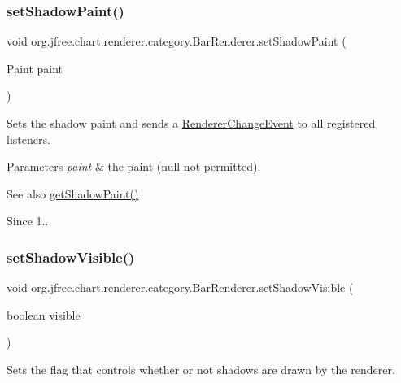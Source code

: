 \subsubsection{\texorpdfstring{set\+Shadow\+Paint()}{setShadowPaint()}}
{\footnotesize\ttfamily void org.\+jfree.\+chart.\+renderer.\+category.\+Bar\+Renderer.\+set\+Shadow\+Paint (\begin{DoxyParamCaption}\item[{Paint}]{paint }\end{DoxyParamCaption})}

Sets the shadow paint and sends a \mbox{\hyperlink{}{Renderer\+Change\+Event}} to all registered listeners.


\begin{DoxyParams}{Parameters}
{\em paint} & the paint ({\ttfamily null} not permitted).\\
\hline
\end{DoxyParams}
\begin{DoxySeeAlso}{See also}
\mbox{\hyperlink{classorg_1_1jfree_1_1chart_1_1renderer_1_1category_1_1_bar_renderer_adf1357a6926c8a92fa990e486e68913e}{get\+Shadow\+Paint()}}
\end{DoxySeeAlso}
\begin{DoxySince}{Since}
1.. 
\end{DoxySince}
\mbox{\label{classorg_1_1jfree_1_1chart_1_1renderer_1_1category_1_1_bar_renderer_acff51b6f76e546d3df309c2521051b5a}} 
\subsubsection{\texorpdfstring{set\+Shadow\+Visible()}{setShadowVisible()}}
{\footnotesize\ttfamily void org.\+jfree.\+chart.\+renderer.\+category.\+Bar\+Renderer.\+set\+Shadow\+Visible (\begin{DoxyParamCaption}\item[{boolean}]{visible }\end{DoxyParamCaption})}

Sets the flag that controls whether or not shadows are drawn by the renderer.


